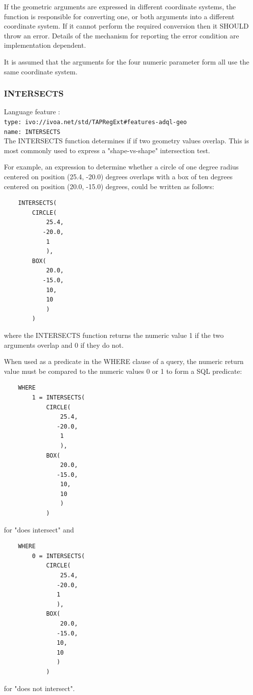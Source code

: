 \documentclass[11pt,a4paper]{ivoa}
\begin{document}
If the  geometric arguments are expressed in different coordinate systems,
the function is responsible for converting one, or both arguments into a
different coordinate system.
If it cannot perform the required conversion then it SHOULD throw an
error.
Details of the mechanism for reporting the error condition are
implementation dependent.

It is assumed that the arguments for the four numeric parameter form all
use the same coordinate system.

\subsubsection{INTERSECTS}
\label{sec:functions.geom.intersects}
{\footnotesize Language feature :}\\
{\footnotesize \verb|type: ivo://ivoa.net/std/TAPRegExt#features-adql-geo|}\\
{\footnotesize \verb|name: INTERSECTS|}\\

The INTERSECTS function determines if if two geometry values overlap. This is
most commonly used to express a "shape-vs-shape" intersection test.

For example, an expression to determine whether a circle of one degree radius
centered on position (25.4, -20.0) degrees overlaps with a box of ten degrees
centered on position (20.0, -15.0) degrees, could be written as follows:
\begin{verbatim}
    INTERSECTS(
        CIRCLE(
            25.4,
           -20.0,
            1
            ),
        BOX(
            20.0,
           -15.0,
            10,
            10
            )
        )
\end{verbatim}
\noindent
where the INTERSECTS function returns the numeric value 1 if the two arguments
overlap and 0 if they do not.

When used as a predicate in the WHERE clause of a query, the numeric return
value must be compared to the numeric values 0 or 1 to form a SQL predicate:
\begin{verbatim}
    WHERE
        1 = INTERSECTS(
            CIRCLE(
                25.4,
               -20.0,
                1
                ),
            BOX(
                20.0,
               -15.0,
                10,
                10
                )
            )
\end{verbatim}
\noindent
for "does intersect" and
\begin{verbatim}
    WHERE
        0 = INTERSECTS(
            CIRCLE(
                25.4,
               -20.0,
               1
               ),
            BOX(
                20.0,
               -15.0,
               10,
               10
               )
            )
\end{verbatim}
\noindent
for "does not intersect".
\end{document}
